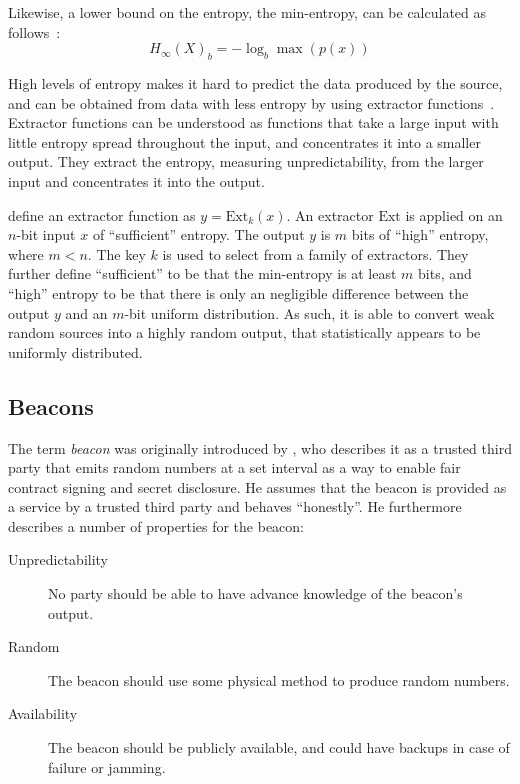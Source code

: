 Likewise, a lower bound on the entropy, the min-entropy, can be calculated as follows~\cite{informationtheory}:
$$
H_\infty(X)_{b} = -\log_{b}\max(p(x))
$$

High levels of entropy makes it hard to predict the data produced by the source, and can be obtained from data with less entropy by using extractor functions~\cite{pseudorandomness}. Extractor functions can be understood as functions that take a large input with little entropy spread throughout the input, and concentrates it into a smaller output. They extract the entropy, measuring unpredictability, from the larger input and concentrates it into the output.

\citet{bonneau2015bitcoin} define an extractor function as $y = \text{Ext}_k(x)$.
An extractor $\text{Ext}$ is applied on an $n$-bit input $x$ of \enquote{sufficient} entropy.
The output $y$ is $m$ bits of \enquote{high} entropy, where $m < n$. The key $k$ is used to select from a family of extractors.
They further define \enquote{sufficient} to be that the min-entropy is at least $m$ bits, and \enquote{high} entropy to be that there is only an negligible difference between the output $y$ and an $m$-bit uniform distribution.
As such, it is able to convert weak random sources into a highly random output, that statistically appears to be uniformly distributed.

\subsection{Beacons}

The term \emph{beacon} was originally introduced by \citet{rabin1983transaction}, who describes it as a trusted third party that emits random numbers at a set interval as a way to enable fair contract signing and secret disclosure.
He assumes that the beacon is provided as a service by a trusted third party and behaves \enquote{honestly}.
He furthermore describes a number of properties for the beacon:

\begin{description}
    \item[Unpredictability] No party should be able to have advance knowledge of the beacon's output.
    \item[Random] The beacon should use some physical method to produce random numbers.
    \item[Availability] The beacon should be publicly available, and could have backups in case of failure or jamming.
\end{description}

